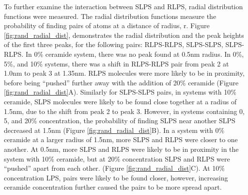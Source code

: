 \documentclass[10pt, letterpaper]{article}
\begin{document}
To further examine the interaction between SLPS and RLPS, radial distribution functions were measured. The radial distribution functions measure the probability of finding pairs of atoms at a distance of radius, r. Figure \ref{fig:rand_radial_dist}, demonstrates the radial distribution and the peak heights of the first three peaks, for the following pairs: RLPS-RLPS, SLPS-SLPS, SLPS-RLPS. In 0\% ceramide system, there was no peak found at 0.5nm radius. In 0\%, 5\%, and 10\% systems, there was a shift in RLPS-RLPS pair from peak 2 at 1.0nm to peak 3 at 1.35nm. RLPS molecules were more likely to be in proximity, before being \enquote{pushed} further away with the addition of 20\% ceramide (Figure \ref{fig:rand_radial_dist}A). Similarly for SLPS-SLPS pairs, in systems with 10\% ceramide, SLPS molecules were likely to be found close together at a radius of 1.5nm, due to the shift from peak 2 to peak 3. However, in systems containing 0, 5, and 20\%  concentration, the probability of finding SLPS near another SLPS decreased at 1.5nm (Figure \ref{fig:rand_radial_dist}B).
In a system with 0\% ceramide at a larger radius of 1.5nm, more SLPS and RLPS were closer to one another. At 0.5nm, more SLPS and RLPS were likely to be in proximity in the system with 10\% ceramide, but at 20\% concentration SLPS and RLPS were \enquote{pushed} apart from each other. (Figure \ref{fig:rand_radial_dist}C). At 10\% concentration LPS, pairs were likely to be found closer, however, increasing ceramide concentration further caused the pairs to be more spread apart.

 
\end{document}
